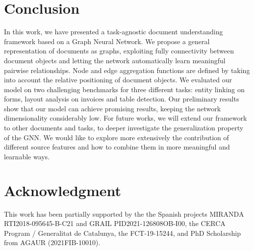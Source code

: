 \documentclass[runningheads]{llncs}
\begin{document}
\section{Conclusion}\label{s:conclusion}
In this work, we have presented a task-agnostic document understanding framework based on a Graph Neural Network. We propose a general representation of documents as graphs, exploiting fully connectivity between document objects and letting the network automatically learn meaningful pairwise relationships. Node and edge aggregation functions are defined by taking into account the relative positioning of document objects. We evaluated our model on two challenging benchmarks for three different tasks: entity linking on forms, layout analysis on invoices and table detection. Our preliminary results show that our model can achieve promising results, keeping the network dimensionality considerably low.
For future works, we will extend our framework to other documents and tasks, to deeper investigate the generalization property of the GNN. We would like to explore more extensively the contribution of different source features and how to combine them in more meaningful and learnable ways.




 
\section*{Acknowledgment}

This work has been partially supported by the the Spanish projects MIRANDA RTI2018-095645-B-C21 and GRAIL PID2021-126808OB-I00, the CERCA Program / Generalitat de Catalunya, the FCT-19-15244, and PhD Scholarship from AGAUR (2021FIB-10010).

\clearpage


\end{document}

